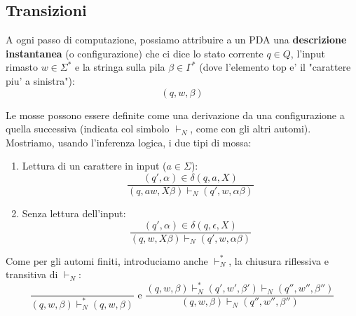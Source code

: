 
\subsection{Transizioni}

A ogni passo di computazione, possiamo attribuire a un PDA una \textbf{descrizione instantanea} (o configurazione) che ci dice lo stato corrente $ q \in Q $, l'input rimasto $ w \in \Sigma^* $ e la stringa sulla pila $ \beta \in \Gamma^* $ (dove l'elemento top e' il "carattere piu' a sinistra"): 
\[
(q, w, \beta) 
\]

Le mosse possono essere definite come una derivazione da una configurazione a quella successiva (indicata col simbolo $ \vdash_N $, come con gli altri automi). Mostriamo, usando l'inferenza logica, i due tipi di mossa:
\begin{enumerate}
  \item Lettura di un carattere in input ($ a \in \Sigma $):
    \[
     \frac{(q', \alpha) \in \delta(q, a, X)}{(q, a w, X \beta) \vdash_N (q', w, \alpha \beta)} 
    \]
  \item Senza lettura dell'input:
    \[
      \frac{(q', \alpha) \in \delta(q, \epsilon, X)}{(q, w, X \beta) \vdash_N (q', w, \alpha \beta)}
    \]
\end{enumerate}

Come per gli automi finiti, introduciamo anche $ \vdash^*_N $, la chiusura riflessiva e transitiva di $ \vdash_N $:
\[
  \frac{}{(q, w, \beta) \vdash^*_N (q, w, \beta)} \text{ e } \frac{(q, w, \beta) \vdash^*_N (q', w', \beta') \vdash_N (q'', w'', \beta'')}{(q, w, \beta) \vdash_N (q'', w'', \beta'')}
\]

